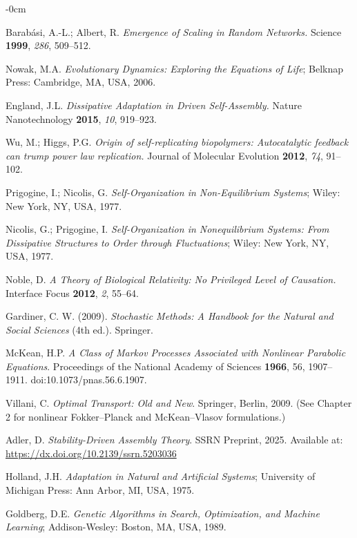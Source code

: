\documentclass[life,article,submit,pdftex,moreauthors]{Definitions/mdpi}
\begin{document}
\begin{adjustwidth}{-\extralength}{0cm}
{\begin{thebibliography}{999}
Barabási, A.-L.; Albert, R. \textit{Emergence of Scaling in Random Networks.} Science \textbf{1999}, \textit{286}, 509–512.

Nowak, M.A. \textit{Evolutionary Dynamics: Exploring the Equations of Life}; Belknap Press: Cambridge, MA, USA, 2006.

England, J.L. \textit{Dissipative Adaptation in Driven Self-Assembly.} Nature Nanotechnology \textbf{2015}, \textit{10}, 919–923.

Wu, M.; Higgs, P.G. \textit{Origin of self-replicating biopolymers: Autocatalytic feedback can trump power law replication.} Journal of Molecular Evolution \textbf{2012}, \textit{74}, 91–102.

Prigogine, I.; Nicolis, G. \textit{Self-Organization in Non-Equilibrium Systems}; Wiley: New York, NY, USA, 1977.

Nicolis, G.; Prigogine, I. \textit{Self-Organization in Nonequilibrium Systems: From Dissipative Structures to Order through Fluctuations}; Wiley: New York, NY, USA, 1977.

Noble, D. \textit{A Theory of Biological Relativity: No Privileged Level of Causation.} Interface Focus \textbf{2012}, \textit{2}, 55–64.

 Gardiner, C. W. (2009). \textit{Stochastic Methods: A Handbook for the Natural and Social Sciences} (4th ed.). Springer.

McKean, H.P. 
\textit{A Class of Markov Processes Associated with Nonlinear Parabolic Equations}. 
Proceedings of the National Academy of Sciences \textbf{1966}, 56, 1907–1911. doi:10.1073/pnas.56.6.1907.

Villani, C. 
\textit{Optimal Transport: Old and New}. Springer, Berlin, 2009. 
(See Chapter 2 for nonlinear Fokker–Planck and McKean–Vlasov formulations.)

Adler, D.
\textit{Stability-Driven Assembly Theory}.
SSRN Preprint, 2025. Available at: \url{https://dx.doi.org/10.2139/ssrn.5203036}

Holland, J.H. \textit{Adaptation in Natural and Artificial Systems}; University of Michigan Press: Ann Arbor, MI, USA, 1975.

Goldberg, D.E. \textit{Genetic Algorithms in Search, Optimization, and Machine Learning}; Addison-Wesley: Boston, MA, USA, 1989.


\end{thebibliography}}
\end{adjustwidth}
\end{document}
